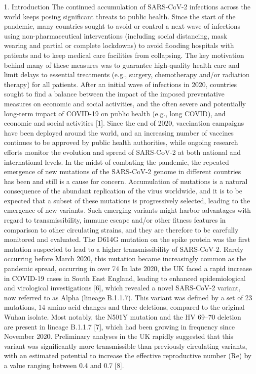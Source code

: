 1. Introduction
The continued accumulation of SARS-CoV-2 infections across the world keeps posing significant threats to public health. Since the start of the pandemic, many countries sought to avoid or control a next wave of infections using non-pharmaceutical interventions (including social distancing, mask wearing and partial or complete lockdowns) to avoid flooding hospitals with patients and to keep medical care facilities from collapsing. The key motivation behind many of these measures was to guarantee high-quality health care and limit delays to essential treatments (e.g., surgery, chemotherapy and/or radiation therapy) for all patients. After an initial wave of infections in 2020, countries sought to find a balance between the impact of the imposed preventative measures on economic and social activities, and the often severe and potentially long-term impact of COVID-19 on public health (e.g., long COVID), and economic and social activities [1]. Since the end of 2020, vaccination campaigns have been deployed around the world, and an increasing number of vaccines continues to be approved by public health authorities, while ongoing research efforts monitor the evolution and spread of SARS-CoV-2 at both national and international levels.
In the midst of combating the pandemic, the repeated emergence of new mutations of the SARS-CoV-2 genome in different countries has been and still is a cause for concern. Accumulation of mutations is a natural consequence of the abundant replication of the virus worldwide, and it is to be expected that a subset of these mutations is progressively selected, leading to the emergence of new variants. Such emerging variants might harbor advantages with regard to transmissibility, immune escape and/or other fitness features in comparison to other circulating strains, and they are therefore to be carefully monitored and evaluated. The D614G mutation on the spike protein was the first mutation suspected to lead to a higher transmissibility of SARS-CoV-2. Rarely occurring before March 2020, this mutation became increasingly common as the pandemic spread, occurring in over 74%
In late 2020, the UK faced a rapid increase in COVID-19 cases in South East England, leading to enhanced epidemiological and virological investigations [6], which revealed a novel SARS-CoV-2 variant, now referred to as Alpha (lineage B.1.1.7). This variant was defined by a set of 23 mutations, 14 amino acid changes and three deletions, compared to the original Wuhan isolate. Most notably, the N501Y mutation and the HV 69–70 deletion are present in lineage B.1.1.7 [7], which had been growing in frequency since November 2020. Preliminary analyses in the UK rapidly suggested that this variant was significantly more transmissible than previously circulating variants, with an estimated potential to increase the effective reproductive number (Re) by a value ranging between 0.4 and 0.7 [8].
